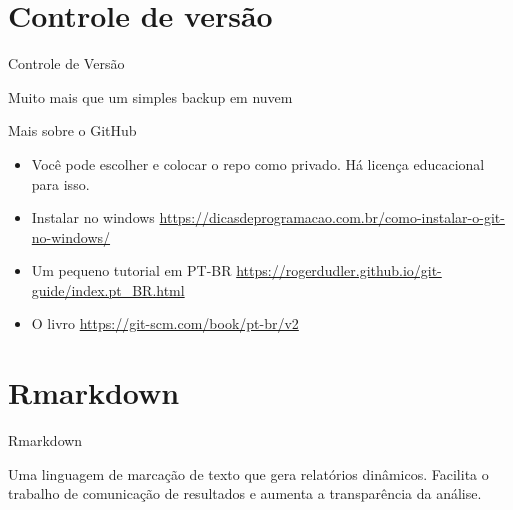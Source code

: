 \documentclass[handout]{beamer}
\begin{document}
\section{Controle de versão}
    \begin{frame}{Controle de Versão}

        
      \begin{center}
        Muito mais que um simples backup em nuvem 
\end{center}

      

\end{frame}


\begin{frame}{Mais sobre o GitHub}
  \begin{itemize}
  \item Você pode escolher e colocar o repo como privado. Há licença educacional para isso.
    
  \item Instalar no windows \url{https://dicasdeprogramacao.com.br/como-instalar-o-git-no-windows/}


    
  \item Um pequeno tutorial em PT-BR \url{https://rogerdudler.github.io/git-guide/index.pt_BR.html}

    
  \item O livro \url{https://git-scm.com/book/pt-br/v2}

    \end{itemize}

  \end{frame}



  \section{Rmarkdown}

  \begin{frame}{Rmarkdown}

    Uma linguagem de marcação de texto que gera relatórios dinâmicos. Facilita o trabalho de comunicação de resultados e aumenta a transparência da análise.

    
  \end{frame}
\end{document}
